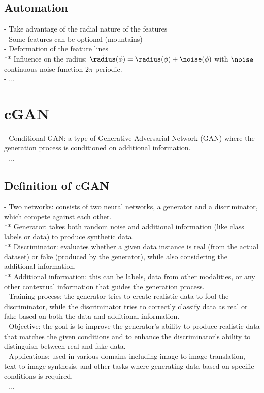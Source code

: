 \subsection{Automation}
- Take advantage of the radial nature of the features \\
- Some features can be optional (mountains) \\
- Deformation of the feature lines \\ 
** Influence on the radius: $\Tilde \radius(\phi) = \radius(\phi) + \noise(\phi)$ with $\noise$ continuous noise function $2\pi$-periodic. \\
- ...

\section{cGAN}
\label{sec:coral-island_cGAN}
- Conditional GAN: a type of Generative Adversarial Network (GAN) where the generation process is conditioned on additional information. \\
- ...

\subsection{Definition of cGAN}
- Two networks: consists of two neural networks, a generator and a discriminator, which compete against each other. \\
** Generator: takes both random noise and additional information (like class labels or data) to produce synthetic data. \\
** Discriminator: evaluates whether a given data instance is real (from the actual dataset) or fake (produced by the generator), while also considering the additional information. \\
** Additional information: this can be labels, data from other modalities, or any other contextual information that guides the generation process. \\
- Training process: the generator tries to create realistic data to fool the discriminator, while the discriminator tries to correctly classify data as real or fake based on both the data and additional information. \\
- Objective: the goal is to improve the generator's ability to produce realistic data that matches the given conditions and to enhance the discriminator's ability to distinguish between real and fake data. \\
- Applications: used in various domains including image-to-image translation, text-to-image synthesis, and other tasks where generating data based on specific conditions is required. \\
- ...

